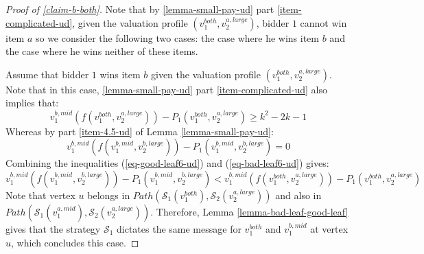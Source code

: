 \begin{proof}[Proof of \cref{claim-b-both}]
    Note that by \cref{lemma-small-pay-ud} part \ref{item-complicated-ud}, given the valuation profile $(v_1^{both},v_2^{a,large})$, bidder $1$ cannot win item $a$ so we consider the following two cases: the case where he wins item $b$ and the case where he wins neither of these items.

    Assume that bidder $1$ wins item $b$ given the valuation profile $(v_1^{both},v_2^{a,large})$. Note that in this case, \cref{lemma-small-pay-ud} part \ref{item-complicated-ud} also implies that:
    \begin{equation}\label{eq-good-leaf6-ud}
 v_1^{b,mid}(f(v_1^{both},v_2^{a,large}))-P_1(v_1^{both},v_2^{a,large})\ge k^2 -2k-1   
\end{equation}
Whereas by part \ref{item-4.5-ud} of Lemma \ref{lemma-small-pay-ud}: 
 \begin{equation}\label{eq-bad-leaf6-ud}
 v_1^{b,mid}(f(v_1^{b,mid},v_2^{b,large}))-P_1(v_1^{b,mid},v_2^{b,large})= 0   
\end{equation}
Combining the inequalities (\ref{eq-good-leaf6-ud}) and (\ref{eq-bad-leaf6-ud}) gives:
\begin{equation*}
 v_1^{b,mid}(f(v_1^{b,mid},v_2^{b,large}))-P_1(v_1^{b,mid},v_2^{b,large})< 
 v_1^{b,mid}(f(v_1^{both},v_2^{a,large}))-P_1(v_1^{both},v_2^{a,large})
\end{equation*}
Note that vertex $u$ belongs in $Path(\mathcal S_1(v_1^{both}),\mathcal S_2(v_2^{a,large}))$ and also in
$Path(\mathcal{S}_1(v_1^{a,mid}),\allowbreak\mathcal{S}_2(v_2^{a,large}))$. Therefore, Lemma \ref{lemma-bad-leaf-good-leaf} gives that the strategy $\mathcal S_1$ dictates the same message for  $v_1^{both}$ and $v_1^{b,mid}$ at vertex $u$, which concludes this case.


\end{proof}
